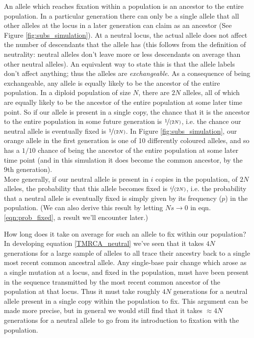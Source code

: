 An allele which reaches fixation within a population is an ancestor to the
entire population. In a particular generation there can only be a single allele
that all other alleles at the locus in a later generation can claim as an
ancestor (See Figure \ref{fig:subs_simulation}). At a neutral locus, the actual allele does not affect the number of
descendants that the allele has (this follows from the definition of
neutrality: neutral alleles don't leave more or less descendants on average than other neutral alleles).
An equivalent way to state this is that the allele labels don't affect
anything; thus the alleles are \emph{exchangeable}. As a consequence of being exchangeable,
any allele is equally likely to be the ancestor of the entire population.  In a
diploid population of size $N$, there are $2N$ alleles, all of which are
equally likely to be the ancestor of the entire population at some later time
point. So if our allele is present in a single copy, the chance that it is the
ancestor to the entire population in some future generation is
$\nicefrac{1}{(2N)}$, i.e. the chance our neutral allele is eventually fixed is
$\nicefrac{1}{(2N)}$.  In Figure \ref{fig:subs_simulation}, our orange allele
in the first generation is one of 10 differently coloured alleles, and so has a
$1/10$ chance of being the ancestor of the entire population at some later time
point (and in this simulation it does become the common ancestor, by the 9th generation).\\

More generally, if our neutral allele is present in $i$ copies in the
population, of $2N$ alleles, the probability that this allele becomes fixed is
$\nicefrac{i}{(2N)}$, i.e. the probability that a neutral allele is eventually
fixed is simply given by its frequency ($p$) in the population.  (We can also
derive this result by letting $Ns \rightarrow 0$ in eqn.
\eqref{eqn:prob_fixed}, a result we'll encounter later.)



How long does it take on average for
such an allele to fix within our population? In developing
equation \eqref{TMRCA_neutral} we've seen that it takes $4N$
generations for a large sample of alleles to all trace their ancestry back to a
single most recent common ancestral allele. Any single-base pair change which arose as a single mutation at a locus, and fixed in the population, must have been present in the sequence transmitted by the most recent common ancestor of the population at that locus. Thus it must take roughly $4N$ generations
for a neutral allele present in a single copy within the population to fix.
 This argument can be made more
precise, but in general we would still find that it takes $\approx 4N$
generations for a neutral allele to go from its introduction to fixation with
the population.   \\

